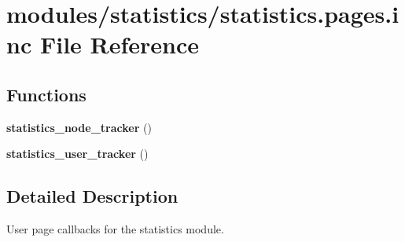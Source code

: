\hypertarget{statistics_8pages_8inc}{
\section{modules/statistics/statistics.pages.inc File Reference}
\label{statistics_8pages_8inc}
}
\subsection*{Functions}
\begin{CompactItemize}
\item 
\hypertarget{statistics_8pages_8inc_b371a704c4976518dc917c947b4ee4de}{
\textbf{statistics\_\-node\_\-tracker} ()}
\label{statistics_8pages_8inc_b371a704c4976518dc917c947b4ee4de}

\item 
\hypertarget{statistics_8pages_8inc_63b64d387a60a4698e520f2b5a75a271}{
\textbf{statistics\_\-user\_\-tracker} ()}
\label{statistics_8pages_8inc_63b64d387a60a4698e520f2b5a75a271}

\end{CompactItemize}


\subsection{Detailed Description}
User page callbacks for the statistics module. 